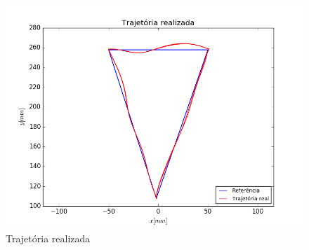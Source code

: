 \documentclass[]{politex}
\begin{document}
\begin{figure}[H]
	\centering
	\includegraphics[scale=0.39]{../../../Experimental/Aquisicoes/PIDSMCx_triangulo/xy.png}  
	\caption{Trajetória realizada}
	\label{fig:PIDSMCx_triangulo_xy}
\end{figure}
\end{document}
